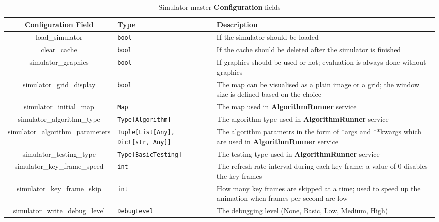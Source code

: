 \begin{appendices}
\begin{table}[h!]
    \footnotesize
    \centerfloat
    \begin{tabular}{|c|M{2.45cm}|M{7cm}|}
        \hline
        \textbf{Configuration Field} & \textbf{Type} & \textbf{Description} \\
        \hline
        load\_simulator & \texttt{bool} & If the simulator should be loaded \\
        \hline
        clear\_cache & \texttt{bool} & If the cache should be deleted after the simulator is finished \\
        \hline
        simulator\_graphics & \texttt{bool} & If graphics should be used or not; evaluation is always done without graphics \\
        \hline
        simulator\_grid\_display & \texttt{bool} & The map can be visualised as a plain image or a grid; the window size is defined based on the choice \\
        \hline
        simulator\_initial\_map & \texttt{Map} & The map used in \textbf{AlgorithmRunner} service\\
        \hline
        simulator\_algorithm\_type & \texttt{Type[Algorithm]} & The algorithm type used in \textbf{AlgorithmRunner} service\\
        \hline
        simulator\_algorithm\_parameters & \texttt{Tuple[List[Any], Dict[str, Any]]} & The algorithm parametrs in the form of *args and **kwargs which are used in  \textbf{AlgorithmRunner} service\\
        \hline
        simulator\_testing\_type & \texttt{Type[BasicTesting]} & The testing type used in \textbf{AlgorithmRunner} service\\
        \hline
        simulator\_key\_frame\_speed & \texttt{int} & The refresh rate interval during each key frame; a value of 0 disables the key frames \\
        \hline
        simulator\_key\_frame\_skip & \texttt{int} & How many key frames are skipped at a time; used to speed up the animation when frames per second are low \\
        \hline
        simulator\_write\_debug\_level & \texttt{DebugLevel} & The debugging level (None, Basic, Low, Medium, High) \\
        \hline
    \end{tabular}
    \caption{Simulator master \textbf{Configuration} fields}
    \label{tab: sim_master_config}
\end{table}


\end{appendices}
